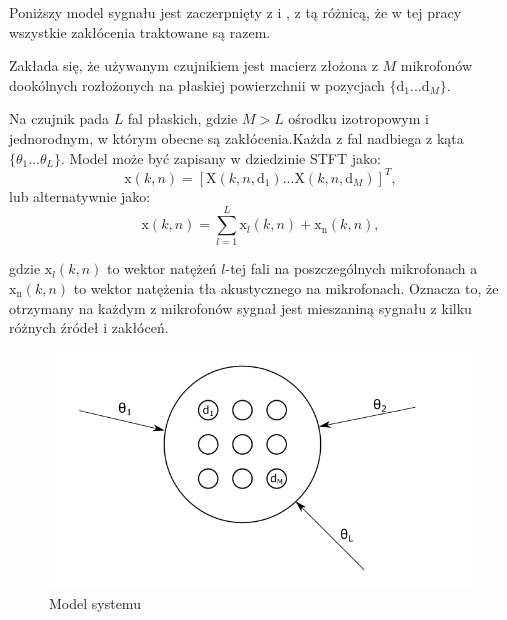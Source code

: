 \newpage 

\noindent Poniższy model sygnału jest zaczerpnięty z \cite{Thiergart2013} i \cite{Braun2014}, z tą różnicą, że w tej pracy wszystkie zakłócenia traktowane są razem.

\noindent Zakłada się, że używanym czujnikiem jest macierz złożona z $M$ mikrofonów dookólnych rozłożonych na płaskiej powierzchnii w pozycjach $\{\bm{\mathrm{d}}_1...\bm{\mathrm{d}}_M\}$.

\noindent Na czujnik pada $L$ fal płaskich, gdzie $M > L$ ośrodku izotropowym i jednorodnym, w którym obecne są zakłócenia.Każda z fal nadbiega z kąta $\{{\theta}_1...{\theta}_L\}$. Model może być zapisany w dziedzinie STFT jako:
\begin{equation}
    \label{equation:2.1}
    \bm{\mathrm{x}}(k,n)
    =
    [\mathrm{X}(k,n,\bm{\mathrm{d}}_{1})
    ...
    \mathrm{X}(k,n,\bm{\mathrm{d}}_{M})]^{T},
\end{equation}
lub alternatywnie jako:
\begin{equation}
    \label{equation:2.2}
    \bm{\mathrm{x}}(k,n)=
    \sum_{l=1}^{L} \bm{\mathrm{x}}_{l}(k,n)
    + \bm{\mathrm{x}}_{\mathrm{n}}(k,n),
\end{equation}

\noindent gdzie $\bm{\mathrm{x}}_l(k,n)$ to wektor natężeń $l$-tej fali na poszczególnych mikrofonach a $\bm{\mathrm{x}}_{\mathrm{n}}(k,n)$ to wektor natężenia tła akustycznego na mikrofonach.
Oznacza to, że otrzymany na każdym z mikrofonów sygnał jest mieszaniną sygnału z kilku różnych źródeł i zakłóceń.

\begin{figure}[h]
    \centering
    \includegraphics[width=\textwidth]{Images/model.png}
    \caption{Model systemu}
    \label{fig:model}
\end{figure}


